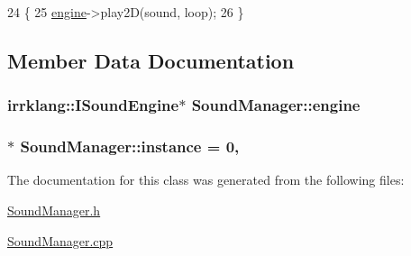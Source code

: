 \begin{DoxyCode}
24 \{
25     \hyperlink{class_sound_manager_ad4ffe937e2b5ed08e75156cfd847580f}{engine}->play2D(sound, loop);
26 \}\end{DoxyCode}


\subsection{Member Data Documentation}
\hypertarget{class_sound_manager_ad4ffe937e2b5ed08e75156cfd847580f}{
\subsubsection[{engine}]{\setlength{\rightskip}{0pt plus 5cm}irrklang\-::\-I\-Sound\-Engine$\ast$ Sound\-Manager\-::engine}}\label{class_sound_manager_ad4ffe937e2b5ed08e75156cfd847580f}
\hypertarget{class_sound_manager_a14c7698bbced59a1774a3f95e0affc61}{
\subsubsection[{instance}]{ $\ast$ Sound\-Manager\-::instance = 0\hspace{0.3cm}{\ttfamily [static]}, {\ttfamily [private]}}}\label{class_sound_manager_a14c7698bbced59a1774a3f95e0affc61}


The documentation for this class was generated from the following files\-:\begin{DoxyCompactItemize}
\item 
\hyperlink{_sound_manager_8h}{Sound\-Manager.\-h}\item 
\hyperlink{_sound_manager_8cpp}{Sound\-Manager.\-cpp}\end{DoxyCompactItemize}
